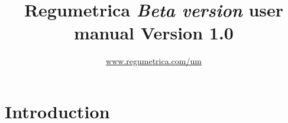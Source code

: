 %
%

\graphicspath{ {../../../graphs/} }
\makeatletter
{}
\makeatother

	\title{Regumetrica \linebreak \emph{Beta version} \linebreak <Tool name> user manual \linebreak Version 1.0 \\}
	\author{\href{https://www.regumetrica.com/um}{www.regumetrica.com/um}}
	\maketitle
\setcounter{page}{1}
\doublespacing

\tableofcontents
\newpage

\section*{Introduction}





